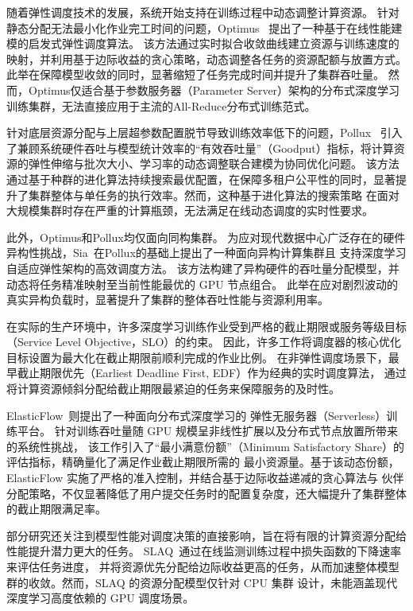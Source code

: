 随着弹性调度技术的发展，系统开始支持在训练过程中动态调整计算资源。
针对静态分配无法最小化作业完工时间的问题，Optimus~\cite{peng2018optimus} 提出了一种基于在线性能建模的启发式弹性调度算法。
该方法通过实时拟合收敛曲线建立资源与训练速度的映射，并利用基于边际收益的贪心策略，动态调整各任务的资源配额与放置方式。
此举在保障模型收敛的同时，显著缩短了任务完成时间并提升了集群吞吐量。
然而，Optimus仅适合基于参数服务器（Parameter Server）架构的分布式深度学习训练集群，无法直接应用于主流的All-Reduce分布式训练范式。

针对底层资源分配与上层超参数配置脱节导致训练效率低下的问题，Pollux~\cite{qiao2021pollux}
引入了兼顾系统硬件吞吐与模型统计效率的“有效吞吐量”（Goodput）指标，将计算资源的弹性伸缩与批次大小、学习率的动态调整联合建模为协同优化问题。
该方法通过基于种群的进化算法持续搜索最优配置，在保障多租户公平性的同时，显著提升了集群整体与单任务的执行效率。然而，这种基于进化算法的搜索策略
在面对大规模集群时存在严重的计算瓶颈，无法满足在线动态调度的实时性要求。

此外，Optimus和Pollux均仅面向同构集群。
为应对现代数据中心广泛存在的硬件异构性挑战，Sia~\cite{jayaram2023sia}在Pollux的基础上提出了一种面向异构计算集群且
支持深度学习自适应弹性架构的高效调度方法。
该方法构建了异构硬件的吞吐量分配模型，并动态将任务精准映射至当前性能最优的 GPU 节点组合。
此举在应对剧烈波动的真实异构负载时，显著提升了集群的整体吞吐性能与资源利用率。

在实际的生产环境中，许多深度学习训练作业受到严格的截止期限或服务等级目标（Service Level Objective，SLO）的约束。
因此，许多工作将调度器的核心优化目标设置为最大化在截止期限前顺利完成的作业比例。
在非弹性调度场景下，最早截止期限优先（Earliest Deadline First, EDF）作为经典的实时调度算法，
通过将计算资源倾斜分配给截止期限最紧迫的任务来保障服务的及时性。

ElasticFlow~\cite{gu2023elasticflow}则提出了一种面向分布式深度学习的
弹性无服务器（Serverless）训练平台。
针对训练吞吐量随 GPU 规模呈非线性扩展以及分布式节点放置所带来的系统性挑战，
该工作引入了“最小满意份额”（Minimum Satisfactory Share）的评估指标，精确量化了满足作业截止期限所需的
最小资源量。基于该动态份额，ElasticFlow 实施了严格的准入控制，并结合基于边际收益递减的贪心算法与
伙伴分配策略，不仅显著降低了用户提交任务时的配置复杂度，还大幅提升了集群整体的截止期限满足率。

部分研究还关注到模型性能对调度决策的直接影响，旨在将有限的计算资源分配给性能提升潜力更大的任务。
SLAQ~\cite{zhang2017slaq}通过在线监测训练过程中损失函数的下降速率来评估任务进度，
并将资源优先分配给边际收益更高的任务，从而加速整体模型群的收敛。然而，SLAQ 的资源分配模型仅针对 CPU 集群
设计，未能涵盖现代深度学习高度依赖的 GPU 调度场景。

